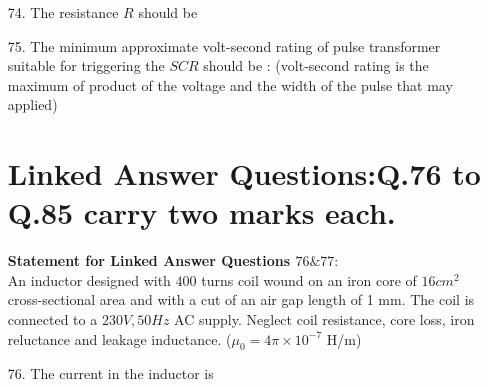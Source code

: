 \documentclass[journal,12pt,onecolumn]{IEEEtran}
\theoremstyle{remark}
\begin{document}
\begin{enumerate}
  \item [74.] The resistance $R$ should be
\begin{enumerate}
\end{enumerate}  
    \item [75.] The minimum approximate volt-second rating of pulse transformer suitable for triggering the $SCR$ should be : (volt-second rating is the maximum of product of the voltage and the width of the pulse that may applied)
      \begin{enumerate}    
              \end{enumerate}   
\section{Linked Answer Questions:Q.76 to Q.85 carry two marks each.}              
 \textbf{Statement for Linked Answer Questions $76\&77:$} \\        
 An inductor designed with $400$ turns coil wound on an iron core of $16 cm^2$ cross-sectional area and with a cut of an air gap length of 1 mm. The coil is connected to a $230 V, 50 Hz$ AC supply. Neglect coil resistance, core loss, iron reluctance and leakage inductance. ($\mu_0 = 4\pi \times 10^{-7}$ H/m)
    \item [76.] The current in the inductor is
    \begin{enumerate}
    \end{enumerate}
    

\end{enumerate}
\end{document}
